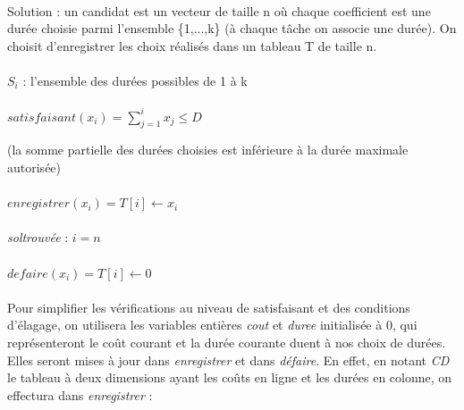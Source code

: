 \documentclass[a4paper, titlepage]{article}
\begin{document}
		\paragraph{}\noindent
		Solution : un candidat est un vecteur de taille n où chaque coefficient est une durée choisie parmi l'ensemble \{1,...,k\} (à chaque tâche on associe une durée).
		On choisit d'enregistrer les choix réalisés dans un tableau T de taille n.

		\paragraph{}\noindent
		$S_{i}$ : l'ensemble des durées possibles de 1 à k

		\paragraph{}\noindent
		$satisfaisant(x_{i}) = \sum_{j=1}^{i} x_{j} \le D$

		(la somme partielle des durées choisies est inférieure à la durée maximale autorisée)

		\paragraph{}\noindent
		$enregistrer(x_{i}) = T[i] \leftarrow x_{i}$

		\paragraph{}\noindent
		\emph{soltrouvée} : $i = n$

		\paragraph{}\noindent
		$defaire(x_{i}) = T[i] \leftarrow 0$

		\paragraph{}
		Pour simplifier les vérifications au niveau de satisfaisant et des conditions d'élagage, on utilisera les variables entières \emph{cout} et \emph{duree} initialisée à 0,
		qui représenteront le coût courant et la durée courante duent à nos choix de durées.
		Elles seront mises à jour dans \emph{enregistrer} et dans \emph{défaire}.
		En effet, en notant \emph{CD} le tableau à deux dimensions ayant les coûts en ligne et les durées en colonne, on effectura dans \emph{enregistrer} :
\end{document}
